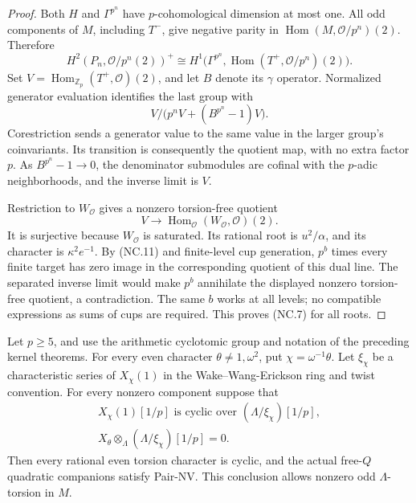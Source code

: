 \begin{proof}
Both \(H\) and \(\Gamma^{p^n}\) have \(p\)-cohomological
dimension at most one.  All odd components of \(M\), including \(T^-\),
give negative parity in \(\operatorname{Hom}(M,\mathcal O/p^n)(2)\).
Therefore
\[
 H^2(P_n,\mathcal O/p^n(2))^+
 \cong H^1\bigl(\Gamma^{p^n},
         \operatorname{Hom}(T^+,\mathcal O/p^n)(2)\bigr).
                                                               \tag{NC.12}
\]
Set \(V=\operatorname{Hom}_{\mathbb Z_p}(T^+,\mathcal O)(2)\),
and let \(B\) denote its \(\gamma\) operator.  Normalized
generator evaluation identifies the last group with
\[
                   V/\bigl(p^nV+(B^{p^n}-1)V\bigr).         \tag{NC.13}
\]
Corestriction sends a generator value to the same value in
the larger group's coinvariants.  Its transition is consequently
the quotient map, with no extra factor \(p\).
As \(B^{p^n}-1\to0\), the denominator submodules are cofinal
with the \(p\)-adic neighborhoods, and the inverse limit is \(V\).

Restriction to \(W_{\mathcal O}\) gives a nonzero torsion-free
quotient
\[
 V\longrightarrow
       \operatorname{Hom}_{\mathcal O}(W_{\mathcal O},\mathcal O)(2).
\]
It is surjective because \(W_{\mathcal O}\) is saturated.
Its rational root is \(u^2/\alpha\), and its character is
\(\kappa^2 e^{-1}\).
By (NC.11) and finite-level cup generation, \(p^b\) times every
finite target has zero image in the corresponding quotient of
this dual line.  The separated inverse limit would make \(p^b\)
annihilate the displayed nonzero torsion-free quotient,
a contradiction.  The same \(b\) works at all levels; no
compatible expressions as sums of cups are required.
This proves (NC.7) for all roots.
\end{proof}

\begin{corollary}\label{cor:wwe-pair}
Let \(p\geq5\), and use the arithmetic cyclotomic group and
notation of the preceding kernel theorems.
For every even character \(\theta\ne1,\omega^2\), put
\(\chi=\omega^{-1}\theta\).
Let \(\xi_\chi\) be a characteristic series of \(X_\chi(1)\)
in the Wake--Wang-Erickson ring and twist convention.
For every nonzero component suppose that
\[
 \begin{gathered}
 X_\chi(1)[1/p]\text{ is cyclic over }
                         (\Lambda/\xi_\chi)[1/p],\\
 X_\theta\otimes_\Lambda(\Lambda/\xi_\chi)[1/p]=0.
 \end{gathered}                                             \tag{NC.14}
\]
Then every rational even torsion character is cyclic, and the
actual free-\(Q\) quadratic companions satisfy Pair-NV.
This conclusion allows nonzero odd \(\Lambda\)-torsion in \(M\).
\end{corollary}

